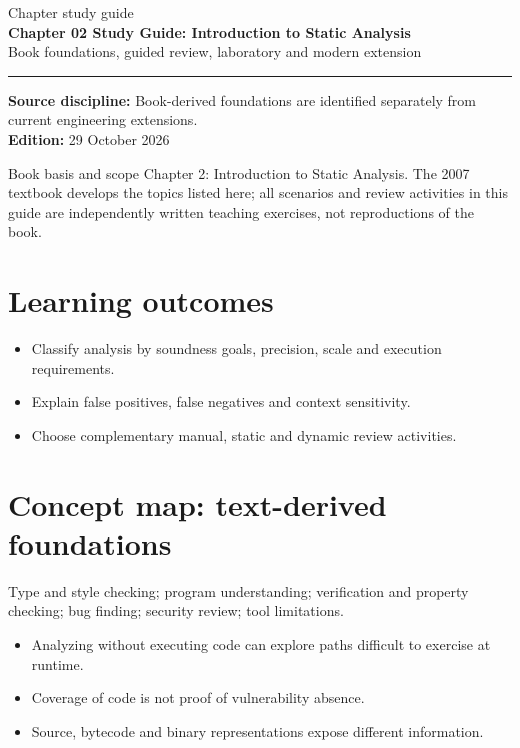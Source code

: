 \documentclass[10pt,letterpaper]{article}
\begin{document}
\hypersetup{pageanchor=false}%
\begin{titlepage}
\vspace*{1.0in}
{\color{bluegray}\Large Chapter study guide}\\[1.0em]
{\color{navy}\Huge\bfseries Chapter 02 Study Guide: Introduction to Static Analysis}\\[0.7em]
{\Large Book foundations, guided review, laboratory and modern extension}\\[2.0em]
\rule{\linewidth}{1.0pt}
\vfill
\textbf{Source discipline:} Book-derived foundations are identified separately from current engineering extensions.\\
\textbf{Edition:} 29 October 2026
\end{titlepage}\hypersetup{pageanchor=true}
\tableofcontents
\clearpage
\begin{focusbox}{Book basis and scope}
Chapter 2: Introduction to Static Analysis. The 2007 textbook develops the topics listed here; all scenarios and review activities in this guide are independently written teaching exercises, not reproductions of the book.\end{focusbox}
\section{Learning outcomes}
\begin{itemize}
\item Classify analysis by soundness goals, precision, scale and execution requirements.
\item Explain false positives, false negatives and context sensitivity.
\item Choose complementary manual, static and dynamic review activities.
\end{itemize}

\section{Concept map: text-derived foundations}
Type and style checking; program understanding; verification and property checking; bug finding; security review; tool limitations.
\begin{itemize}
\item Analyzing without executing code can explore paths difficult to exercise at runtime.
\item Coverage of code is not proof of vulnerability absence.
\item Source, bytecode and binary representations expose different information.
\end{itemize}
\end{document}
